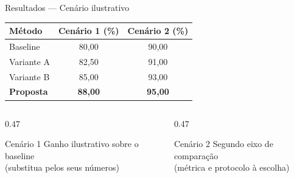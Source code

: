\documentclass[aspectratio=169, 10pt, brazil]{beamer}
\begin{document}
\begin{frame}{Resultados — Cenário ilustrativo}
  \centering\small\renewcommand{\arraystretch}{1.15}
  \begin{tabular}{@{}lcc@{}}
    \toprule
    \rowcolor{icompTealDark}
    \color{white}\textbf{Método} &
    \color{white}\textbf{Cenário 1 (\%)} &
    \color{white}\textbf{Cenário 2 (\%)} \\
    \midrule
    Baseline                     & 80{,}00 & 90{,}00 \\
    \rowcolor{icompCanvas}
    Variante A                   & 82{,}50 & 91{,}00 \\
    Variante B                   & 85{,}00 & 93{,}00 \\
    \midrule
    \rowcolor{icompLimeSoft}
    \textbf{Proposta} &
      \textbf{88{,}00} & \textbf{95{,}00} \\
    \bottomrule
  \end{tabular}
  \vspace{0.4em}
  \begin{columns}[T]
    \begin{column}{0.47\textwidth}
      \begin{destaque}{Cenário 1}
        Ganho ilustrativo sobre o baseline\\
        (substitua pelos seus números)
      \end{destaque}
    \end{column}
    \begin{column}{0.47\textwidth}
      \begin{destaque}{Cenário 2}
        Segundo eixo de comparação\\
        (métrica e protocolo à escolha)
      \end{destaque}
    \end{column}
  \end{columns}
\end{frame}
\end{document}
